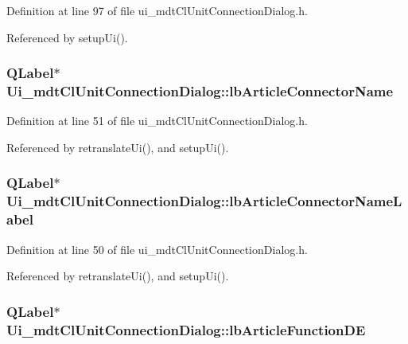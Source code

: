 Definition at line 97 of file ui\-\_\-mdt\-Cl\-Unit\-Connection\-Dialog.\-h.



Referenced by setup\-Ui().

\hypertarget{class_ui__mdt_cl_unit_connection_dialog_a6456badeda08ce61f9bd8e569e3c9a87}{
\subsubsection[{lb\-Article\-Connector\-Name}]{\setlength{\rightskip}{0pt plus 5cm}Q\-Label$\ast$ Ui\-\_\-mdt\-Cl\-Unit\-Connection\-Dialog\-::lb\-Article\-Connector\-Name}}\label{class_ui__mdt_cl_unit_connection_dialog_a6456badeda08ce61f9bd8e569e3c9a87}


Definition at line 51 of file ui\-\_\-mdt\-Cl\-Unit\-Connection\-Dialog.\-h.



Referenced by retranslate\-Ui(), and setup\-Ui().

\hypertarget{class_ui__mdt_cl_unit_connection_dialog_a2766403cf829a30b2b12fc545d9e4786}{
\subsubsection[{lb\-Article\-Connector\-Name\-Label}]{\setlength{\rightskip}{0pt plus 5cm}Q\-Label$\ast$ Ui\-\_\-mdt\-Cl\-Unit\-Connection\-Dialog\-::lb\-Article\-Connector\-Name\-Label}}\label{class_ui__mdt_cl_unit_connection_dialog_a2766403cf829a30b2b12fc545d9e4786}


Definition at line 50 of file ui\-\_\-mdt\-Cl\-Unit\-Connection\-Dialog.\-h.



Referenced by retranslate\-Ui(), and setup\-Ui().

\hypertarget{class_ui__mdt_cl_unit_connection_dialog_a5498c0710b24f86bf8baddf74e4705f6}{
\subsubsection[{lb\-Article\-Function\-D\-E}]{\setlength{\rightskip}{0pt plus 5cm}Q\-Label$\ast$ Ui\-\_\-mdt\-Cl\-Unit\-Connection\-Dialog\-::lb\-Article\-Function\-D\-E}}\label{class_ui__mdt_cl_unit_connection_dialog_a5498c0710b24f86bf8baddf74e4705f6}


